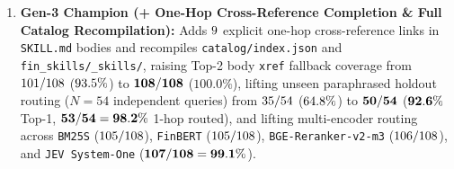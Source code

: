 \begin{enumerate}
\item \textbf{Gen-3 Champion (+ One-Hop Cross-Reference Completion \& Full Catalog Recompilation):} Adds $9{}$ explicit one-hop cross-reference links in \texttt{SKILL.md} bodies and recompiles \texttt{catalog/index.json} and \texttt{fin\_skills/\_skills/}, raising Top-2 body \texttt{xref} fallback coverage from $101{}/108$ ($93.5{}\%$) to $\mathbf{108{}/108}$ ($\mathbf{100.0\%}$), lifting unseen paraphrased holdout routing ($N=54$ independent queries) from $35{}/54$ ($64.8{}\%$) to $\mathbf{50{}/54}$ ($\mathbf{92.6{}\%}$ Top-1, $\mathbf{53{}/54 = 98.2{}\%}$ 1-hop routed), and lifting multi-encoder routing across \texttt{BM25S} ($105{}/108$), \texttt{FinBERT} ($105{}/108$), \texttt{BGE-Reranker-v2-m3} ($106{}/108$), and \texttt{JEV System-One} ($\mathbf{107{}/108 = 99.1{}\%}$).
\end{enumerate}

